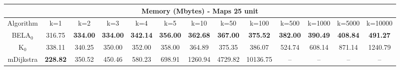 \begin{tabular}{c|cccccccccccc}\toprule
\multicolumn{13}{c}{Memory (Mbytes) - Maps 25 unit}\\ \midrule
Algorithm & k=1 & k=2 & k=3 & k=4 & k=5 & k=10 & k=50 & k=100 & k=500 & k=1000 & k=5000 & k=10000 \\ \midrule
BELA$_0$ & 316.75 & \textbf{334.00} & \textbf{334.00} & \textbf{342.14} & \textbf{356.00} & \textbf{362.68} & \textbf{367.00} & \textbf{375.52} & \textbf{382.00} & \textbf{390.49} & \textbf{408.84} & \textbf{491.27} \\
K$_0$ & 338.11 & 340.25 & 350.00 & 352.00 & 358.00 & 364.89 & 375.35 & 386.07 & 524.74 & 608.14 & 871.14 & 1240.79 \\
mDijkstra & \textbf{228.82} & 350.52 & 450.46 & 580.23 & 698.91 & 1260.94 & 4729.82 & 10136.75 & -- & -- & -- & -- \\ \bottomrule 
\end{tabular}
